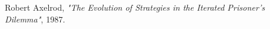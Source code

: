 \begin{thebibliography}{1}
     Robert Axelrod, \emph{"The Evolution of Strategies in the Iterated Prisoner's Dilemma"}, 1987.
\end{thebibliography}